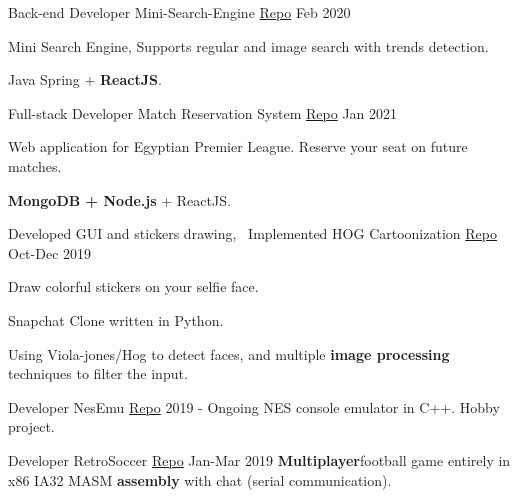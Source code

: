 \begin{cventries}
  \cventry
    {Back-end Developer} %
    {Mini-Search-Engine \tiny{\href{https://github.com/mido3ds/mini-search-engine/}{Repo}}} %
    {} %
    {Feb 2020} %
    {
      \begin{cvitems} %
        \item {Mini Search Engine, Supports regular and image search with trends detection.}
        \item {Java Spring + \textbf{ReactJS}.}
      \end{cvitems}
    }

  \cventry
    {Full-stack Developer} %
    {Match Reservation System \tiny{\href{https://github.com/mido3ds/match-reservation-system}{Repo}}} %
    {} %
    {Jan 2021} %
    {
      \begin{cvitems} %
        \item {Web application for Egyptian Premier League. Reserve your seat on future matches.}
        \item {\textbf{MongoDB + Node.js} + ReactJS.}
      \end{cvitems}
    }

  \cventry
    {Developed GUI and stickers drawing, ~Implemented HOG} %
    {Cartoonization \tiny{\href{http://github.com/Abdulrahman-Khalid/Cartoonization/}{Repo}}} %
    {} %
    {Oct-Dec 2019} %
    {
      \begin{cvitems} %
        \item {Draw colorful stickers on your selfie face.}
        \item {Snapchat Clone written in Python.}
        \item {Using ​Viola-jones/Hog ​to detect faces, and multiple \textbf{image processing} techniques to filter the input.}
      \end{cvitems}
    }

    \cventry
    {Developer} %
    {NesEmu \tiny{\href{https://github.com/mido3ds/nesemu}{Repo}}} %
    {} %
    {2019 - Ongoing} %
    {
      NES console ​emulator​ in C++. Hobby project.
    }

    \cventry
    {Developer} %
    {RetroSoccer \tiny{\href{https://github.com/mido3ds/retrosoccer}{Repo}}} %
    {} %
    {Jan-Mar 2019} %
    {
      {\textbf{Multiplayer​} football ​game​ entirely in x86 IA32 MASM \textbf{​assembly​} with chat (serial communication).}
    }


\end{cventries}
